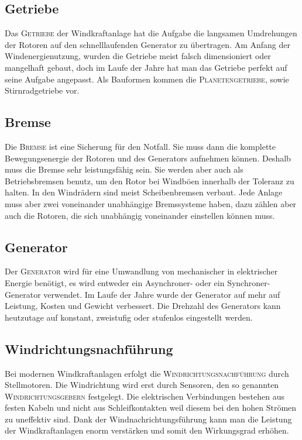 \documentclass[12pt]{scrbook}
\begin{document}
\subsection{Getriebe}

Das \textsc{Getriebe} der Windkraftanlage hat die Aufgabe die langsamen Umdrehungen der
Rotoren auf den schnelllaufenden Generator zu übertragen. Am Anfang der
Windenergienutzung, wurden die Getriebe meist falsch dimensioniert oder
mangelhaft gebaut, doch im Laufe der Jahre hat man das Getriebe perfekt auf
seine Aufgabe angepasst. Als Bauformen kommen die \textsc{Planetengetriebe}, sowie
Stirnradgetriebe vor.

\subsection{Bremse}

Die \textsc{Bremse} ist eine Sicherung für den Notfall. Sie muss dann die komplette
Bewegungsenergie der Rotoren und des Generators aufnehmen können. Deshalb muss
die Bremse sehr leistungsfähig sein. Sie werden aber auch als Betriebsbremsen
benutz, um den Rotor bei Windböen innerhalb der Toleranz zu halten. In den
Windrädern sind meist Scheibenbremsen verbaut. Jede Anlage muss aber zwei
voneinander unabhängige Bremssysteme haben, dazu zählen aber auch die Rotoren,
die sich unabhängig voneinander einstellen können muss.


\subsection{Generator}

Der \textsc{Generator} wird für eine Umwandlung von mechanischer in elektrischer
Energie benötigt, es wird entweder ein Asynchroner- oder ein Synchroner-
Generator verwendet. Im Laufe der Jahre wurde der Generator auf mehr auf
Leistung, Kosten und Gewicht verbessert. Die Drehzahl des Generators kann
heutzutage auf konstant, zweistufig oder stufenlos eingestellt werden.


\subsection{Windrichtungsnachführung}

Bei modernen Windkraftanlagen erfolgt die \textsc{Windrichtungsnachführung} durch
Stellmotoren. Die Windrichtung wird erst durch Sensoren, den so genannten
\textsc{Windrichtungsgebern} festgelegt. Die elektrischen Verbindungen bestehen aus
festen Kabeln und nicht aus Schleifkontakten weil diesem bei den hohen Strömen
zu uneffektiv sind. Dank der Windnachrichtungsführung kann man die Leistung
der Windkraftanlagen enorm verstärken und somit den Wirkungsgrad erhöhen.
\end{document}
